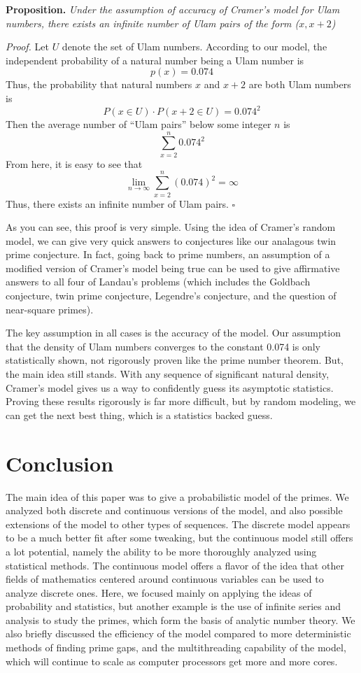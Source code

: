 \documentclass[conference]{IEEEtran}
\begin{document}
\medskip\noindent
\textbf{Proposition.} \textit{Under the assumption of accuracy of Cramer's model for Ulam numbers, there exists an infinite number of Ulam pairs of the form ($x, x + 2$)} 

\smallskip\noindent
\textit{Proof.} Let $U$ denote the set of Ulam numbers. According to our model, the independent probability of a natural number being a Ulam number is
    \[p(x) = 0.074\]
Thus, the probability that natural numbers $x$ and $x + 2$ are both Ulam numbers is
    \[P(x \in U) \cdot P(x + 2 \in U) = 0.074^2\]
Then the average number of ``Ulam pairs'' below some integer $n$ is
\[\sum_{x = 2}^{n}0.074^2\]
From here, it is easy to see that
\[\lim_{n\rightarrow \infty} \sum_{x = 2}^{n}(0.074)^2 = \infty\]
Thus, there exists an infinite number of Ulam pairs.
\hfill$\square$\medskip

As you can see, this proof is very simple. Using the idea of Cramer's random model, we can give very quick answers to conjectures like our analagous twin prime conjecture. In fact, going back to prime numbers, an assumption of a modified version of Cramer's model being true can be used to give affirmative answers to all four of Landau's problems \cite{b1} (which includes the Goldbach conjecture, twin prime conjecture, Legendre's conjecture, and the question of near-square primes).

The key assumption in all cases is the accuracy of the model. Our assumption that the density of Ulam numbers converges to the constant 0.074 is only statistically shown, not rigorously proven like the prime number theorem. But, the main idea still stands. With any sequence of significant natural density, Cramer's model gives us a way to confidently guess its asymptotic statistics. Proving these results rigorously is far more difficult, but by random modeling, we can get the next best thing, which is a statistics backed guess. 

\section{Conclusion}
The main idea of this paper was to give a probabilistic
model of the primes. We analyzed both discrete and
continuous versions of the model, and also possible
extensions of the model to other types of sequences. The
discrete model appears to be a much better fit after
some tweaking, but the continuous model still offers
a lot potential, namely the ability to be more thoroughly
analyzed using statistical methods. The continuous
model offers a flavor of the idea that other fields of
mathematics centered around continuous variables can be
used to analyze discrete ones. Here, we focused mainly
on applying the ideas of probability and statistics,
but another example is the use of infinite series and
analysis to study the primes, which form the basis of
analytic number theory. We also
briefly discussed the efficiency of the model compared
to more deterministic methods of finding prime gaps, and
the multithreading capability of the model, which will
continue to scale as computer processors get more and
more cores.
\end{document}
